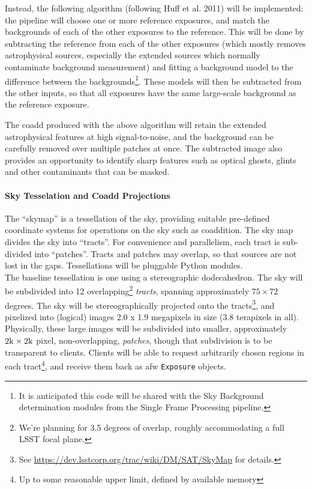 \documentclass[12pt]{article}
\begin{document}
Instead, the following algorithm (following Huff et al. 2011) will be implemented: the pipeline will choose one or more reference exposures, and match the backgrounds of each of the other exposures to the reference.  This will be done by subtracting the reference from each of the other exposures (which mostly removes astrophysical sources, especially the extended sources which normally contaminate background measurement) and fitting a background model to the difference between the backgrounds\footnote{It is anticipated this code will be shared with the Sky Background determination modules from the Single Frame Processing pipeline.}. These models will then be subtracted from the other inputs, so that all exposures have the same large-scale background as the reference exposure. 

The coadd produced with the above algorithm will retain the extended astrophysical features at high signal-to-noise, and the background can be carefully removed over multiple patches at once. The subtracted image also provides an opportunity to identify sharp features such as optical ghosts, glints and other contaminants that can be masked.

\paragraph{Sky Tesselation and Coadd Projections\label{alg:skymap}} 

The ``skymap'' is a tessellation of the sky, providing suitable pre-defined coordinate systems for operations on the sky such as coaddition.  The sky map divides the sky into ``tracts''.  For convenience and parallelism, each tract is sub-divided into ``patches''.  Tracts and patches may overlap, so that sources are not lost in the gaps. Tessellations will be pluggable Python modules.
\\

The baseline tessellation is one using a stereographic dodecahedron. The sky will be subdivided into 12 overlapping\footnote{We're planning for 3.5 degrees of overlap, roughly accommodating a full LSST focal plane.} {\em tracts}, spanning approximately $75 \times 72$ degrees. The sky will be stereographically projected onto the tracts\footnote{See \url{https://dev.lsstcorp.org/trac/wiki/DM/SAT/SkyMap} for details.}, and pixelized into (logical) images 2.0 x 1.9 megapixels in size (3.8 terapixels in all). Physically, these large images will be subdivided into smaller, approximately $2{\rm k} \times 2{\rm k}$ pixel, non-overlapping, {\em patches}, though that subdivision is to be transparent to clients. Clients will be able to request arbitrarily chosen regions in each tract\footnote{Up to some reasonable upper limit, defined by available memory}, and receive them back as afw {\tt Exposure} objects.
\end{document}
